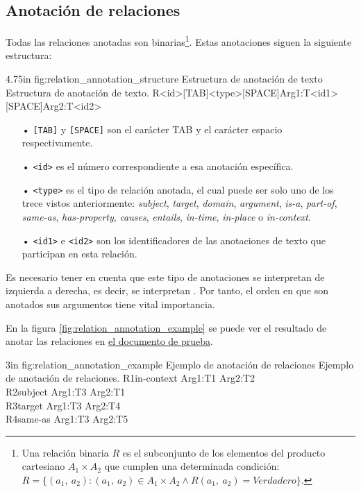 \subsection{Anotación de relaciones}
\label{section:relation_annotation}
Todas las relaciones anotadas son binarias\footnote{Una relación binaria $R$ es el subconjunto de los elementos del producto cartesiano $A_1\times A_2$ que cumplen una determinada condición: $R = \{(a_1,~a_2) : (a_1,~a_2)\in A_1\times A_2\wedge R(a_1,~a_2) = Verdadero \}$.}. Estas anotaciones siguen la siguiente estructura:

\begin{annexample}
	[backgroundcolor=green!13]
	{4.75in}
	{fig:relation_annotation_structure}
	{Estructura de anotación de texto}
	{Estructura de anotación de texto.}
	R<id>[TAB]<type>[SPACE]Arg1:T<id1>[SPACE]Arg2:T<id2>
\end{annexample}

\vspace{-0.3in}
\begin{itemize}
	\item[•] \texttt{[TAB]} y \texttt{[SPACE]} son el carácter TAB y el carácter espacio respectivamente.
	\item[•] \texttt{<id>} es el número correspondiente a esa anotación específica.
	\item[•] \texttt{<type>} es el tipo de relación anotada, el cual puede ser solo uno de los trece vistos anteriormente: {\it subject}, {\it target}, {\it domain}, {\it argument}, {\it is-a}, {\it part-of}, {\it same-as}, {\it has-property}, {\it causes}, {\it entails}, {\it in-time}, {\it in-place} o {\it in-context}.
	\item[•] \texttt{<id1>} e \texttt{<id2>} son los identificadores de las anotaciones de texto que participan en esta relación.
\end{itemize}

Es necesario tener en cuenta que este tipo de anotaciones se interpretan de izquierda a derecha, es decir, se interpretan . Por tanto, el orden en que son anotados sus argumentos tiene vital importancia.

En la figura \ref{fig:relation_annotation_example} se puede ver el resultado de anotar las relaciones en \hyperref[sentence:annotation_example]{el documento de prueba}.

\begin{annexample}
	[backgroundcolor=cyan!13]
	{3in}
	{fig:relation_annotation_example}
	{Ejemplo de anotación de relaciones}
	{Ejemplo de anotación de relaciones.}
	R1\space\space in-context Arg1:T1 Arg2:T2\\
	R2\space\space subject Arg1:T3 Arg2:T1\\
	R3\space\space target Arg1:T3 Arg2:T4\\
	R4\space\space same-as Arg1:T3 Arg2:T5
\end{annexample}

